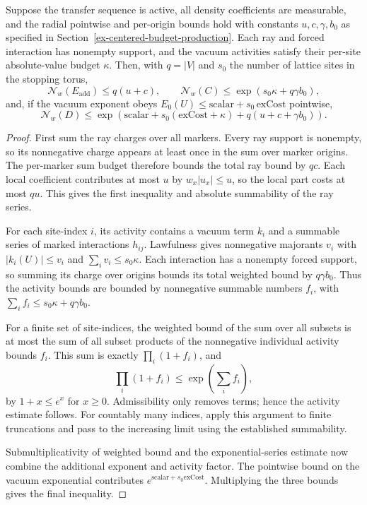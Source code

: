 \begin{lemma}\label{ex-centered-radial-price}
Suppose the transfer sequence is active, all density coefficients are measurable, and the radial pointwise and per-origin bounds hold with constants $u,c,\gamma,b_0$ as specified in Section~\ref{ex-centered-budget-production}. Each ray and forced interaction has nonempty support, and the vacuum activities satisfy their per-site absolute-value budget $\kappa$. Then, with $q=|V|$ and $s_0$ the number of lattice sites in the stopping torus,
\[
 \mathcal N_w(E_{\mathrm{add}})\leq q(u+c),\qquad
 \mathcal N_w(C)\leq \exp(s_0\kappa+q\gamma b_0),
\]
and, if the vacuum exponent obeys $E_0(U)\leq\mathrm{scalar}+s_0\,\mathrm{exCost}$ pointwise,
\[
 \mathcal N_w(D)\leq
 \exp\!\left(\mathrm{scalar}+s_0(\mathrm{exCost}+\kappa)+q(u+c+\gamma b_0)\right).
 \label{ex-centered-density-price}
\]
\end{lemma}
\begin{proof}
First sum the ray charges over all markers. Every ray support is nonempty, so its nonnegative charge appears at least once in the sum over marker origins. The per-marker sum budget therefore bounds the total ray bound by $q c$. Each local coefficient contributes at most $u$ by $w_x|u_x|\leq u$, so the local part costs at most $q u$. This gives the first inequality and absolute summability of the ray series.

For each site-index $i$, its activity contains a vacuum term $k_i$ and a summable series of marked interactions $h_{ij}$. Lawfulness gives nonnegative majorants $v_i$ with $|k_i(U)|\leq v_i$ and $\sum_i v_i\leq s_0\kappa$. Each interaction has a nonempty forced support, so summing its charge over origins bounds its total weighted bound by $q\gamma b_0$. Thus the activity bounds are bounded by nonnegative summable numbers $f_i$, with $\sum_i f_i\leq s_0\kappa+q\gamma b_0$.

For a finite set of site-indices, the weighted bound of the sum over all subsets is at most the sum of all subset products of the nonnegative individual activity bounds $f_i$. This sum is exactly $\prod_i(1+f_i)$, and
\[
 \prod_i(1+f_i)\leq\exp\!\left(\sum_i f_i\right),
\]
by $1+x\leq e^x$ for $x\geq0$. Admissibility only removes terms; hence the activity estimate follows. For countably many indices, apply this argument to finite truncations and pass to the increasing limit using the established summability.

Submultiplicativity of weighted bound and the exponential-series estimate now combine the additional exponent and activity factor. The pointwise bound on the vacuum exponential contributes $e^{\mathrm{scalar}+s_0\mathrm{exCost}}$. Multiplying the three bounds gives the final inequality.
\end{proof}

